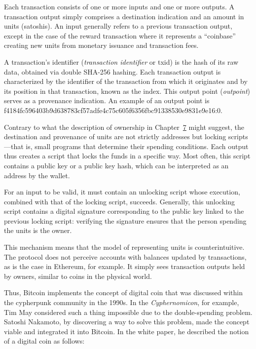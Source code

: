 \documentclass[
  a5paper,
  smalldemyvopaper,10pt,twoside,onecolumn,openright,extrafontsizes,hidelinks]{memoir}
\begin{document}
Each transaction consists of one or more inputs and one or more outputs.
A transaction output simply comprises a destination indication and an
amount in units (satoshis). An input generally refers to a previous
transaction output, except in the case of the reward transaction where
it represents a ``coinbase'' creating new units from monetary issuance
and transaction fees.

A transaction's identifier (\emph{transaction identifier} or txid) is
the hash of its raw data, obtained via double SHA-256 hashing. Each
transaction output is characterized by the identifier of the transaction
from which it originates and by its position in that transaction, known
as the index. This output point (\emph{outpoint}) serves as a provenance
indication. An example of an output point is
f4184fc596403b9d638783cf57adfe4c75c605f6356fbc91338530e9831e9e16:0.

Contrary to what the description of ownership in
Chapter~\hyperref[ch:propriete]{7} might suggest, the destination and
provenance of units are not strictly addresses but locking
scripts---that is, small programs that determine their spending
conditions. Each output thus creates a script that locks the funds in a
specific way. Most often, this script contains a public key or a public
key hash, which can be interpreted as an address by the wallet.

For an input to be valid, it must contain an unlocking script whose
execution, combined with that of the locking script, succeeds.
Generally, this unlocking script contains a digital signature
corresponding to the public key linked to the previous locking script:
verifying the signature ensures that the person spending the units is
the owner.

This mechanism means that the model of representing units is
counterintuitive. The protocol does not perceive accounts with balances
updated by transactions, as is the case in Ethereum, for example. It
simply sees transaction outputs held by owners, similar to coins in the
physical world.

Thus, Bitcoin implements the concept of digital coin that was discussed
within the cypherpunk community in the 1990s. In the
\emph{Cyphernomicon}, for example, Tim May considered such a thing
impossible due to the double-spending problem. Satoshi Nakamoto, by
discovering a way to solve this problem, made the concept viable and
integrated it into Bitcoin. In the white paper, he described the notion
of a digital coin as follows:
\end{document}
